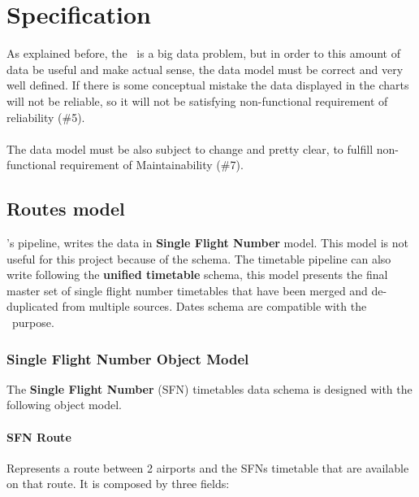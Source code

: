 
\chapter{Specification}

\label{chapter05}

As explained before, the \thesis\ is a big data problem, but in order to this amount of data be useful and make actual sense, the data model must be correct and very well defined. If there is some conceptual mistake the data displayed in the charts will not be reliable, so it will not be satisfying non-functional requirement of reliability (\#5).
\\\\
The data model must be also subject to change and pretty clear, to fulfill non-functional requirement of Maintainability (\#7).


\section{Routes model}

\squad's pipeline, writes the data in \textbf{Single Flight Number} model. This model is not useful for this project because of the  schema. The timetable pipeline can also write following the \textbf{unified timetable} schema, this model presents the final master set of single flight number timetables that have been merged and de-duplicated from multiple sources. Dates schema are compatible with the \thesis\ purpose.

\subsection{Single Flight Number Object Model} \label{sfn-model}

The \textbf{Single Flight Number} (SFN) timetables data schema is designed with the following object model.

\subsubsection*{SFN Route}

Represents a route between 2 airports and the SFNs timetable that are available on that route. It is composed by three fields:

